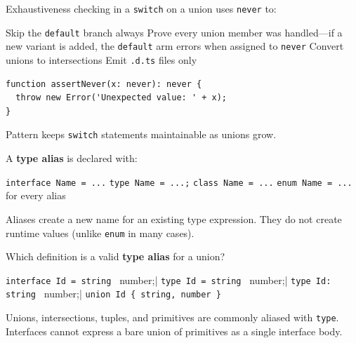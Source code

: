 \question[4]
Exhaustiveness checking in a \lstinline[style=tsinline]|switch| on a union uses \lstinline[style=tsinline]|never| to:
\begin{choices}
  \choice Skip the \lstinline[style=tsinline]|default| branch always
  \CorrectChoice Prove every union member was handled---if a new variant is added, the \lstinline[style=tsinline]|default| arm errors when assigned to \lstinline[style=tsinline]|never|
  \choice Convert unions to intersections
  \choice Emit \texttt{.d.ts} files only
\end{choices}
\begin{solution}
\begin{lstlisting}[style=ts]
function assertNever(x: never): never {
  throw new Error('Unexpected value: ' + x);
}
\end{lstlisting}
  Pattern keeps \lstinline[style=tsinline]|switch| statements maintainable as unions grow.
\end{solution}

\question[4]
A \textbf{type alias} is declared with:
\begin{choices}
  \choice \lstinline[style=tsinline]|interface Name = ...|
  \CorrectChoice \lstinline[style=tsinline]|type Name = ...;|
  \choice \lstinline[style=tsinline]|class Name = ...|
  \choice \lstinline[style=tsinline]|enum Name = ...| for every alias
\end{choices}
\begin{solution}
  Aliases create a new name for an existing type expression. They do not create runtime values (unlike \lstinline[style=tsinline]|enum| in many cases).
\end{solution}

\question[4]
Which definition is a valid \textbf{type alias} for a union?
\begin{choices}
  \choice \lstinline[style=tsinline]|interface Id = string | number;|
  \CorrectChoice \lstinline[style=tsinline]|type Id = string | number;|
  \choice \lstinline[style=tsinline]|type Id: string | number;|
  \choice \lstinline[style=tsinline]|union Id { string, number }|
\end{choices}
\begin{solution}
  Unions, intersections, tuples, and primitives are commonly aliased with \lstinline[style=tsinline]|type|. Interfaces cannot express a bare union of primitives as a single interface body.
\end{solution}

